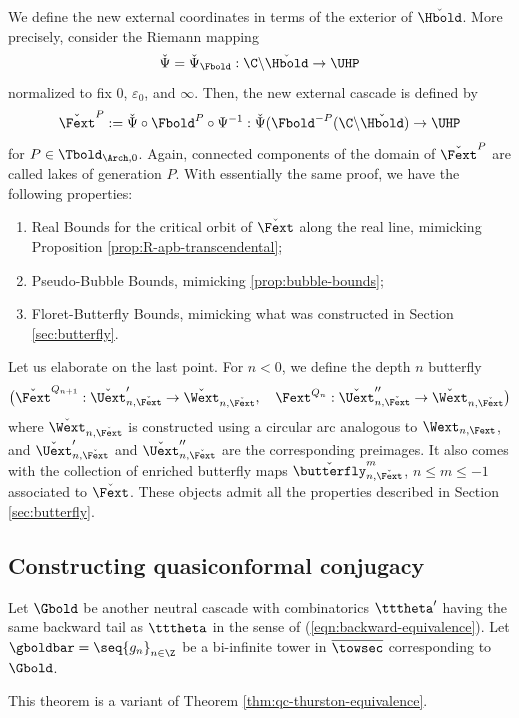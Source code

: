 \documentclass{amsart}
\begin{document}
We define the new external coordinates in terms of the exterior of $\check{\Hbold}$.
More precisely, consider the Riemann mapping
\[
    \check{\Psi} = \check{\Psi}_{\Fbold} : \C \backslash \check{\Hbold} \to \UHP
\]
normalized to fix $0$, $\varepsilon_0$, and $\infty$.
Then, the new external cascade is defined by
\[
    \check{\Fext}^P := \check{\Psi} \circ \Fbold^P \circ \Psi^{-1} : \check{\Psi}(\Fbold^{-P}(\C \backslash \check{\Hbold}) \to \UHP
\]
for $P \in \Tbold_{\Arch,0}$.
Again, connected components of the domain of $\check{\Fext}^P$ are called lakes of generation $P$.
With essentially the same proof, we have the following properties:
\begin{enumerate}
    \item Real Bounds for the critical orbit of $\check{\Fext}$ along the real line, mimicking Proposition \ref{prop:R-apb-transcendental};
    \item Pseudo-Bubble Bounds, mimicking \ref{prop:bubble-bounds};
    \item Floret-Butterfly Bounds, mimicking what was constructed in Section \ref{sec:butterfly}.
\end{enumerate}
Let us elaborate on the last point.
For $n < 0$, we define the depth $n$ butterfly
\[
    \big( \check{\Fext}^{Q_{n+1}}:\check{\Uext}'_{n, \check{\Fext}} \to \check{\Wext}_{n, \check{\Fext}}, \quad  \Fext^{Q_{n}}:\check{\Uext}''_{n, \check{\Fext}} \to \check{\Wext}_{n, \check{\Fext}} \big)
\]
where $\check{\Wext}_{n,\check{\Fext}}$ is constructed using a circular arc analogous to $\Wext_{n,\Fext}$, and $\check{\Uext}'_{n,\check{\Fext}}$ and $\check{\Uext}''_{n,\check{\Fext}}$ are the corresponding preimages.
It also comes with the collection of enriched butterfly maps $\check{\butterfly}_{n,\check{\Fext}}^m$, $n \leq m \leq -1$ associated to $\check{\Fext}$.
These objects admit all the properties described in Section \ref{sec:butterfly}.

\subsection{Constructing quasiconformal conjugacy}

Let $\Gbold$ be another neutral cascade with combinatorics $\tttheta'$ having the same backward tail as $\tttheta$ in the sense of (\ref{eqn:backward-equivalence}). 
Let $\gboldbar = \seq{g_n}_{n\in\Z}$ be a bi-infinite tower in $\overline{\towsec}$ corresponding to $\Gbold$.

This theorem is a variant of Theorem \ref{thm:qc-thurston-equivalence}.
\end{document}
